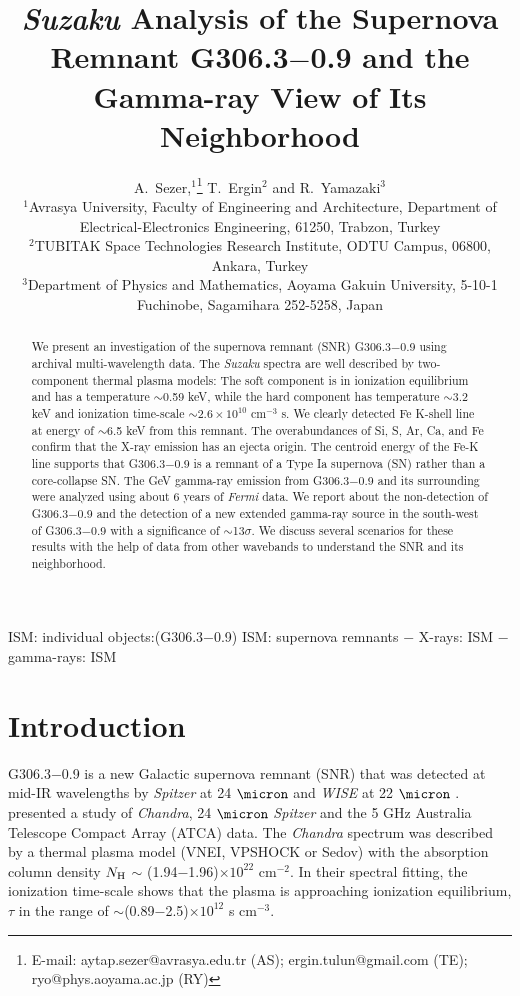 \documentclass[useAMS,usenatbib]{mn2e}
\title[{\it Suzaku} Results of G306.3$-$0.9 \& the Gamma Ray Neighborhood]{{\it Suzaku} Analysis of the Supernova Remnant G306.3$-$0.9 and the Gamma-ray View of Its Neighborhood}
\author[A.Sezer, T.Ergin and R.Yamazaki]{A.~Sezer,$^{1}$\thanks{E-mail: aytap.sezer@avrasya.edu.tr (AS); ergin.tulun@gmail.com (TE); ryo@phys.aoyama.ac.jp (RY)}
T.~Ergin$^{2}$ and R.~Yamazaki$^{3}$\\
$^{1}$Avrasya University, Faculty of Engineering and Architecture, Department of Electrical-Electronics Engineering, 61250, Trabzon, Turkey\\
$^{2}$TUBITAK Space Technologies Research Institute, ODTU Campus, 06800, Ankara, Turkey\\
$^{3}$Department of Physics and Mathematics, Aoyama Gakuin University, 5-10-1 Fuchinobe, Sagamihara 252-5258, Japan\\
}
\begin{document}
\date{}
\pagerange{\pageref{firstpage}--\pageref{lastpage}} 
\maketitle
\label{firstpage}

\begin{abstract}
We present an investigation of the supernova remnant (SNR) G306.3$-$0.9 using archival multi-wavelength data. The {\it Suzaku} spectra are well described by  two-component thermal plasma models: The soft component is in ionization equilibrium and has a temperature $\sim$0.59 keV, while the hard component has temperature $\sim$3.2 keV and ionization time-scale $\sim$$2.6\times10^{10}$ cm$^{-3}$ s. We clearly detected Fe K-shell line at energy of $\sim$6.5 keV from this remnant. The overabundances of Si, S, Ar, Ca, and Fe confirm that the X-ray emission has an ejecta origin. The centroid energy of the Fe-K line supports that G306.3$-$0.9 is a remnant of a Type Ia supernova (SN) rather than a core-collapse SN. The GeV gamma-ray emission from G306.3$-$0.9 and its surrounding were analyzed using about 6 years of {\it Fermi} data. We report about the non-detection of G306.3$-$0.9 and the detection of a new extended gamma-ray source in the south-west of G306.3$-$0.9 with a significance of $\sim$13$\sigma$. We discuss several scenarios for these results with the help of data from other wavebands to understand the SNR and its neighborhood. 
\end{abstract}

\begin{keywords}
ISM: individual objects:(G306.3$-$0.9) ISM: supernova remnants $-$ X-rays: ISM $-$ gamma-rays: ISM
\end{keywords}

\section{Introduction}
G306.3$-$0.9 is a new Galactic supernova remnant (SNR) that was detected at mid-IR wavelengths by {\it Spitzer} at 24 $\micron$ \citep{Ca09} and {\it WISE} at 22 $\micron$ \citep {Wr10}. \citet {Re13} presented a study of {\it Chandra}, 24 $\micron$ {\it Spitzer} and the 5 GHz Australia Telescope Compact Array (ATCA) data. The {\it Chandra} spectrum was described by a thermal plasma model (VNEI, VPSHOCK or Sedov) with the absorption column density $N_{\rm H}$ $\sim$ (1.94$-$1.96)$\times10^{22}$ cm$^{-2}$. 
In their spectral fitting, the ionization time-scale shows that the plasma is approaching ionization equilibrium, $\tau$ in the range of $\sim$(0.89$-$2.5)$\times10^{12}$ s cm$^{-3}$.
\end{document}
